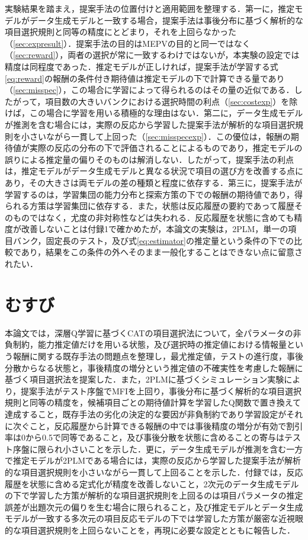 \documentclass[paper]{ieicej}
\begin{document}
実験結果を踏まえ，提案手法の位置付けと適用範囲を整理する．第一に，推定モデルがデータ生成モデルと一致する場合，提案手法は事後分布に基づく解析的な項目選択規則と同等の精度にとどまり，それを上回らなかった（\ref{sec:expresult}）．提案手法の目的はMEPVの目的と同一ではなく（\ref{sec:reward}），両者の選択が常に一致するわけではないが，本実験の設定では精度は同程度であった．推定モデルが正しければ，提案手法が学習する式\eqref{eq:reward}の報酬の条件付き期待値は推定モデルの下で計算できる量であり（\ref{sec:misspec}），この場合に学習によって得られるのはその量の近似である．したがって，項目数の大きいバンクにおける選択時間の利点（\ref{sec:costexp}）を除けば，この場合に学習を用いる積極的な理由はない．第二に，データ生成モデルが推測を含む場合には，実際の反応から学習した提案手法が解析的な項目選択規則を小さいながら一貫して上回った（\ref{sec:misspecexp}）．この優位は，報酬の期待値が実際の反応の分布の下で評価されることによるものであり，推定モデルの誤りによる推定量の偏りそのものは解消しない．したがって，提案手法の利点は，推定モデルがデータ生成モデルと異なる状況で項目の選び方を改善する点にあり，その大きさは両モデルの差の種類と程度に依存する．第三に，提案手法が学習するのは，学習集団の能力分布と探索方策の下での報酬の期待値であり，得られる方策は学習集団に依存する．また，状態は反応履歴の要約であって履歴そのものではなく，尤度の非対称性などは失われる．反応履歴を状態に含めても精度が改善しないことは付録1で確かめたが，本論文の実験は，2PLM，単一の項目バンク，固定長のテスト，及び式\eqref{eq:estimator}の推定量という条件の下での比較であり，結果をこの条件の外へそのまま一般化することはできない点に留意されたい．

\section{むすび}\label{sec:conclusion}

本論文では，深層Q学習に基づくCATの項目選択法について，全パラメータの非負制約，能力推定値だけを用いる状態，及び選択時の推定値における情報量という報酬に関する既存手法の問題点を整理し，最尤推定値，テストの進行度，事後分散からなる状態と，事後精度の増分という推定値の不確実性を考慮した報酬に基づく項目選択法を提案した．また，2PLMに基づくシミュレーション実験により，提案手法がテスト序盤でMFIを上回り，事後分布に基づく解析的な項目選択規則と同等の精度を，候補項目ごとの期待値計算を学習したQ関数で置き換えて達成すること，既存手法の劣化の決定的な要因が非負制約であり学習設定がそれに次ぐこと，反応履歴から計算できる報酬の中では事後精度の増分が有効で割引率は0から0.5で同等であること，及び事後分散を状態に含めることの寄与はテスト序盤に限られ小さいことを示した．更に，データ生成モデルが推測を含む一方で推定モデルが2PLMである場合には，実際の反応から学習した提案手法が解析的な項目選択規則を小さいながら一貫して上回ることを示した．付録では，反応履歴を状態に含める定式化が精度を改善しないこと，2次元のデータ生成モデルの下で学習した方策が解析的な項目選択規則を上回るのは項目パラメータの推定誤差が出題次元の偏りを生む場合に限られること，及び推定モデルとデータ生成モデルが一致する多次元の項目反応モデルの下では学習した方策が厳密な近視眼的な項目選択規則を上回らないことを，再現に必要な設定とともに報告した．
\end{document}
